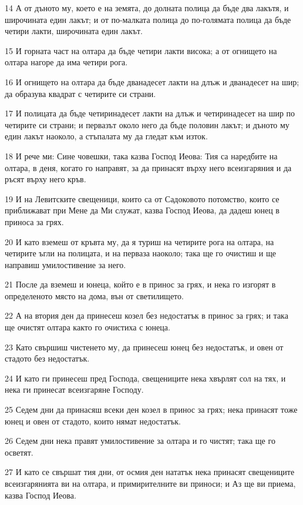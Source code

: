 \par 14 А от дъното му, което е на земята, до долната полица да бъде два лакътя, и широчината един лакът; и от по-малката полица до по-голямата полица да бъде четири лакти, широчината един лакът.
\par 15 И горната част на олтара да бъде четири лакти висока; а от огнището на олтара нагоре да има четири рога.
\par 16 И огнището на олтара да бъде дванадесет лакти на длъж и дванадесет на шир; да образува квадрат с четирите си страни.
\par 17 И полицата да бъде четиринадесет лакти на длъж и четиринадесет на шир по четирите си страни; и первазът около него да бъде половин лакът; и дъното му един лакът наоколо, а стъпалата му да гледат към изток.
\par 18 И рече ми: Сине човешки, така казва Господ Иеова: Тия са наредбите на олтара, в деня, когато го направят, за да принасят върху него всеизгаряния и да ръсят върху него кръв.
\par 19 И на Левитските свещеници, които са от Садоковото потомство, които се приближават при Мене да Ми служат, казва Господ Иеова, да дадеш юнец в приноса за грях.
\par 20 И като вземеш от кръвта му, да я туриш на четирите рога на олтара, на четирите ъгли на полицата, и на перваза наоколо; така ще го очистиш и ще направиш умилостивение за него.
\par 21 После да вземеш и юнеца, който е в принос за грях, и нека го изгорят в определеното място на дома, вън от светилището.
\par 22 А на втория ден да принесеш козел без недостатък в принос за грях; и така ще очистят олтара както го очистиха с юнеца.
\par 23 Като свършиш чистенето му, да принесеш юнец без недостатък, и овен от стадото без недостатък.
\par 24 И като ги принесеш пред Господа, свещениците нека хвърлят сол на тях, и нека ги принесат всеизгаряне Господу.
\par 25 Седем дни да принасяш всеки ден козел в принос за грях; нека принасят тоже юнец и овен от стадото, които нямат недостатък.
\par 26 Седем дни нека правят умилостивение за олтара и го чистят; така ще го осветят.
\par 27 И като се свършат тия дни, от осмия ден нататък нека принасят свещениците всеизгарянията ви на олтара, и примирителните ви приноси; и Аз ще ви приема, казва Господ Иеова.

